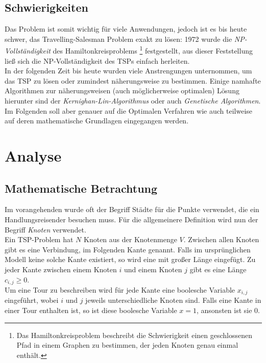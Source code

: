 \documentclass[a4paper, 11pt]{article}
\begin{document}
\subsection{Schwierigkeiten}

Das Problem ist somit wichtig für viele Anwendungen, jedoch ist es bis heute
schwer, das Travelling-Salesman Problem exakt zu lösen: 1972 wurde die
\textit{NP-Vollständigkeit} des Hamiltonkreisproblems \footnote{
  Das Hamiltonkreisproblem beschreibt die Schwierigkeit einen
  geschlossenen Pfad in einem Graphen zu bestimmen, der jeden Knoten genau
  einmal enthält.
} festgestellt, aus dieser Feststellung ließ sich die NP-Vollständigkeit
des TSPs einfach herleiten. \\

In der folgenden Zeit bis heute wurden viele Anstrengungen unternommen, um das
TSP zu lösen oder zumindest näherungsweise zu bestimmen. Einige namhafte Algorithmen
zur näherungsweisen (auch möglicherweise optimalen) Lösung hierunter sind der
\textit{Kernighan-Lin-Algorithmus} oder auch \textit{Genetische Algorithmen}. Im
Folgenden soll aber genauer auf die Optimalen Verfahren wie auch teilweise auf deren
mathematische Grundlagen eingegangen werden.

\section{Analyse}

\subsection{Mathematische Betrachtung}

Im vorangehenden wurde oft der Begriff Städte für die Punkte verwendet, die
ein Handlungsreisender besuchen muss. Für die allgemeinere Definition wird
nun der Begriff \textit{Knoten} verwendet. \\

Ein TSP-Problem hat $N$ Knoten aus der Knotenmenge $V$. Zwischen allen Knoten
gibt es eine Verbindung, im Folgenden Kante genannt. Falls im ursprünglichen
Modell keine solche Kante existiert, so wird eine mit großer Länge eingefügt.
Zu jeder Kante zwischen einem Knoten $i$ und einem Knoten $j$ gibt es eine
Länge $c_{i,j} \geq 0$. \\

Um eine Tour zu beschreiben wird für jede Kante eine boolesche Variable $x_{i,j}$
eingeführt, wobei $i$ und $j$ jeweils unterschiedliche Knoten sind. Falls eine
Kante in einer Tour enthalten ist, so ist diese boolesche Variable $x = 1$,
ansonsten ist sie $0$. \\
\end{document}
